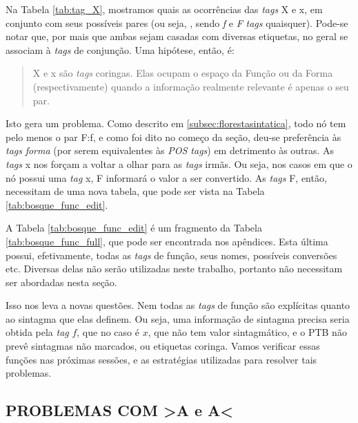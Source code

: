 Na Tabela \ref{tab:tag_X}, mostramos quais as ocorrências das \textit{tags} X e x, em conjunto com seus possíveis pares (ou seja, , sendo \textit{f} e \textit{F} \textit{tags} quaisquer). Pode-se notar que, por mais que ambas sejam casadas com diversas etiquetas, no geral se associam à \textit{tags} de conjunção. Uma hipótese, então, é:
\begin{quote}
	X e x são \textit{tags} coringas. Elas ocupam o espaço da Função ou da Forma (respectivamente) quando a informação realmente relevante é apenas o seu par. 
\end{quote}

Isto gera um problema. Como descrito em \ref{subsec:florestasintatica}, todo nó tem pelo menos o par F:f, e como foi dito no começo da seção, deu-se preferência às \textit{tags} \textit{forma} (por serem equivalentes às \textit{POS tags}) em detrimento às outras. As \textit{tags} x nos forçam a voltar a olhar para as \textit{tags} irmãs. Ou seja, nos casos em que o nó possui uma \textit{tag} x, F informará o valor a ser convertido. As \textit{tags} F, então, necessitam de uma nova tabela, que pode ser vista na Tabela \ref{tab:bosque_func_edit}.
\begin{center}
    
\end{center}

A Tabela \ref{tab:bosque_func_edit} é um fragmento da Tabela \ref{tab:bosque_func_full}, que pode ser encontrada nos apêndices. Esta última possui, efetivamente, todas as \textit{tags} de função, seus nomes, possíveis conversões etc. Diversas delas não serão utilizadas neste trabalho, portanto não necessitam ser abordadas nesta seção.

Isso nos leva a novas questões. Nem todas as \textit{tags} de função são explícitas quanto ao sintagma que elas definem. Ou seja, uma informação de sintagma precisa seria obtida pela \textit{tag} $f$, que no caso é $x$, que não tem valor sintagmático, e o PTB não prevê sintagmas não marcados, ou etiquetas coringa. Vamos verificar essas funções nas próximas sessões, e as estratégias utilizadas para resolver tais problemas.

\subsection{PROBLEMAS COM >A e A<}
\label{subsec:bosque_a}

